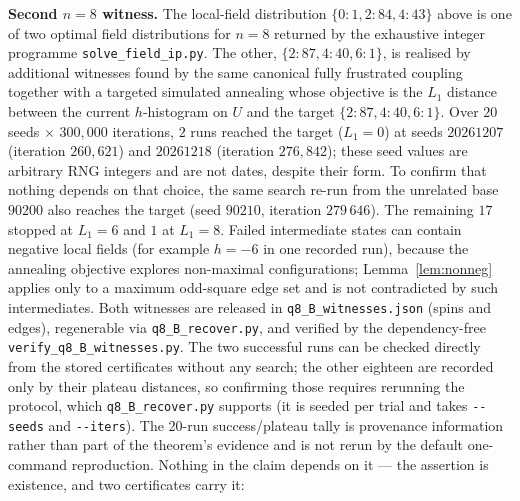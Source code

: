 \documentclass[12pt,a4paper]{article}
\theoremstyle{definition}
\begin{document}
\noindent\textbf{Second $n=8$ witness.}
The local-field distribution $\{0{:}1,2{:}84,4{:}43\}$ above is one
of two optimal field distributions for $n=8$ returned by the exhaustive
integer programme \texttt{solve\_field\_ip.py}. The other,
$\{2{:}87,4{:}40,6{:}1\}$, is realised by additional witnesses found
by the same canonical fully frustrated coupling together with a targeted
simulated annealing whose objective is the $L_1$ distance between the
current $h$-histogram on $U$ and the target $\{2{:}87,4{:}40,6{:}1\}$.
Over $20$ seeds $\times$ $300{,}000$ iterations, $2$ runs reached the
target ($L_1=0$) at seeds $20261207$ (iteration $260{,}621$) and
$20261218$ (iteration $276{,}842$); these seed values are arbitrary RNG
integers and are not dates, despite their form. To confirm that nothing
depends on that choice, the same search re-run from the unrelated base $90200$
also reaches the target (seed $90210$, iteration $279\,646$). The remaining
$17$ stopped at $L_1=6$ and $1$ at $L_1=8$. Failed intermediate states can contain negative local fields (for
example $h=-6$ in one recorded run), because the annealing objective explores
non-maximal configurations; Lemma~\ref{lem:nonneg} applies only to a maximum
odd-square edge set and is not contradicted by such intermediates. Both
witnesses are released in
\texttt{q8\_B\_witnesses.json} (spins and edges), regenerable via
\texttt{q8\_B\_recover.py}, and verified by the dependency-free
\texttt{verify\_q8\_B\_witnesses.py}. The two successful runs can be checked directly from the stored certificates
without any search; the other eighteen are recorded only by their plateau
distances, so confirming those requires rerunning the protocol, which
\texttt{q8\_B\_recover.py} supports (it is seeded per trial and takes
\texttt{-{}-seeds} and \texttt{-{}-iters}). The 20-run success/plateau tally is provenance information rather than part
of the theorem's evidence and is not rerun by the default one-command
reproduction. Nothing in the claim depends on it --- the assertion is
existence, and two certificates carry it:
\end{document}
